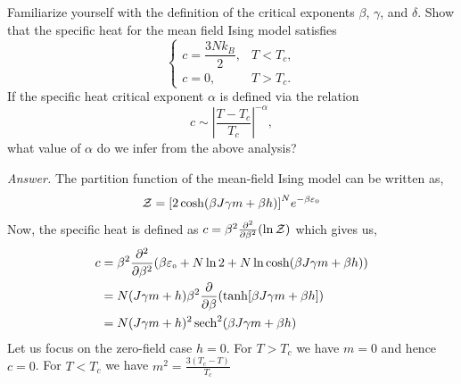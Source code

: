 \begin{question}
Familiarize yourself with the definition of the critical exponents $\beta$, $\gamma$, and $\delta$. Show that the specific heat for the mean field Ising model satisfies
\[
\begin{cases}
c = \dfrac{3N k_B}{2}, & T<T_c,\\[6pt]
c = 0, & T>T_c.
\end{cases}
\]
If the specific heat critical exponent $\alpha$ is defined via the relation
\[
c \sim \left|\frac{T-T_c}{T_c}\right|^{-\alpha},
\]
what value of $\alpha$ do we infer from the above analysis?
\end{question}
\noindent
\textit{Answer.} The partition function of the mean-field Ising model can be written as, 
$$\mathcal Z =\qty[2\cosh(\beta J \gamma m +\beta h)]^N e^{-\beta \varepsilon_{\text{\tiny 0}}}$$
Now, the specific heat is defined as $c=\beta^2 \pdv[2]{\beta}\qty(\ln \mathcal Z )$ which gives us,
\begin{align*}
    c &= \beta^2 \pdv[2]{\beta}\qty(\beta\varepsilon\tund{0} + N\ln2 + N\ln \cosh(\beta J \gamma m +\beta h))\\
    &=N(J\gamma m+h)\beta^2\pdv{\beta}\qty(\tanh[\beta J \gamma m +\beta h])\\
    &=N(J\gamma m+h)^2\sech^2(\beta J \gamma m +\beta h)
\end{align*}
Let us focus on the zero-field case $h=0$. For $T>T_c$ we have $m=0$ and hence $c=0$. For $T<T_c$ we have $m^2 = \frac{3(T_c-T)}{T_c}$